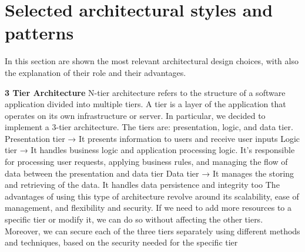 \newpage

\section{Selected architectural styles and patterns}

In this section are shown the most relevant architectural design choices, with also the explanation of their role and their advantages.

\textbf{3 Tier Architecture}\newline
N-tier architecture refers to the structure of a software application divided into multiple tiers. 
A tier is a layer of the application that operates on its own infrastructure or server. 
In particular, we decided to implement a 3-tier architecture. The tiers are: presentation, logic, and data tier.\newline
Presentation tier → It presents information to users and receive user inputs\newline
Logic tier → It handles business logic and application processing logic. It’s responsible for processing user requests, 
applying business rules, and managing the flow of data between the presentation and data tier\newline
Data tier → It manages the storing and retrieving of the data. It handles data persistence and integrity too\newline
The advantages of using this type of architecture revolve around its scalability, ease of management, and flexibility and security. 
If we need to add more resources to a specific tier or modify it, we can do so without affecting the other tiers. Moreover, we can secure each 
of the three tiers separately using different methods and techniques, based on the security needed for the specific tier

